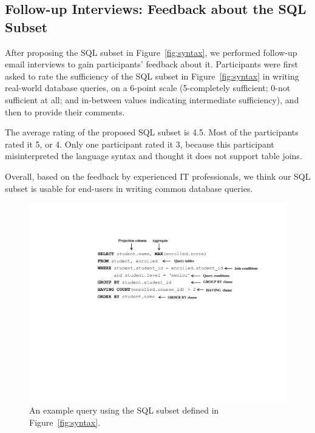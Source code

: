 





\subsection{Follow-up Interviews: Feedback about the SQL Subset}
\label{sec:interview}

After proposing the SQL subset in Figure~\ref{fig:syntax},
we performed follow-up email interviews to gain
participants' feedback about it. Participants were first asked to rate
the sufficiency of the SQL subset in Figure~\ref{fig:syntax}
in writing real-world database queries,
on a 6-point scale (5-completely
sufficient; 0-not sufficient at all;
and in-between values indicating intermediate sufficiency),
and then to provide their comments.

The average rating of the proposed SQL subset is 4.5. Most of
the participants rated it 5, or 4. Only one participant rated
it 3, because this participant misinterpreted the language
syntax and thought it does not support table joins.

Overall, based on the feedback by experienced IT professionals,
we think our SQL subset is usable
for end-users in writing common database queries.

\begin{figure}[t]
  \centering
  \includegraphics[scale=0.55]{queryex}
  \vspace*{-5.0ex}\caption {{\label{fig:queryex}
  An example query using the SQL subset defined in Figure~\ref{fig:syntax}.
}}
\end{figure}
